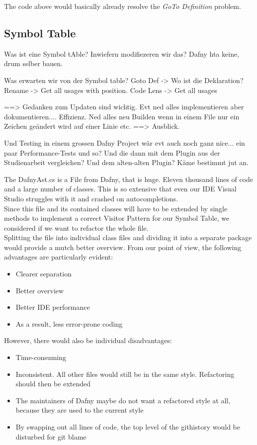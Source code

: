 The code above would basically already resolve the \textit{GoTo Definition} problem.

\subsection{Symbol Table}
Was ist eine Symbol tAble?
Inwiefern modifiezeren wir das?
Dafny hta keine, drum selber bauen.

Was erwarten wir von der Symbol table?
Goto Def -> Wo ist die Deklaration?
Rename -> Get all usages with position.
Code Lens -> Get all usages


==> Gedanken zum Updaten sind wichtig. Evt ned alles implementieren aber dokumentieren.... Effizienz. Ned alles neu Builden
wenn in einem File nur ein Zeichen geändert wird auf einer Linie etc. ==> Ausblick.

Und Testing in einem grossen Dafny Project wär evt auch noch ganz nice... ein paar Performance-Tests und so?
Und die dann mit dem Plugin aus der Studienarbeit vergleichen? Und dem alten-alten Plugin? Käme bestimmt jut an. 

The DafnyAst.cs is a File from Dafny, that is huge.
Eleven thousand lines of code and a large number of classes.
This is so extensive that even our IDE Visual Studio struggles with it and crashed on autocompletions. \\

Since this file and its contained classes will have to be extended by single methods
to implement a correct Visitor Pattern for our Symbol Table, we considered if we want to refactor the whole file.  \\

Splitting the file into individual class files and dividing it into a separate package would provide a mutch better overview.
From our point of view, the following advantages are particularly evident:
\begin{itemize}
    \item Clearer separation
    \item Better overview
    \item Better IDE performance
    \item As a result, less error-prone coding
\end{itemize}

However, there would also be individual disadvantages:
\begin{itemize}
    \item Time-consuming
    \item Inconsistent. All other files would still be in the same style. Refactoring should then be extended
    \item The maintainers of Dafny maybe do not want a refactored style at all, because they are used to the current style
    \item By swapping out all lines of code, the top level of the githistory would be disturbed for git blame
\end{itemize}

